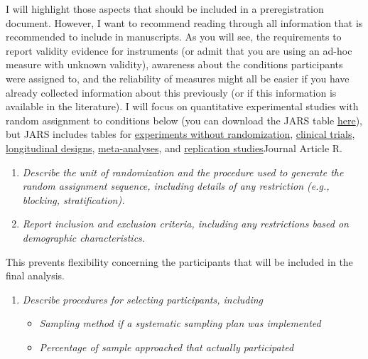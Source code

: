 \documentclass[
  oneside]{book}
\providecommand{\tightlist}{%
  \setlength{\itemsep}{0pt}\setlength{\parskip}{0pt}}
\begin{document}
I will highlight those aspects that should be included in a preregistration document. However, I want to recommend reading through all information that is recommended to include in manuscripts. As you will see, the requirements to report validity evidence for instruments (or admit that you are using an ad-hoc measure with unknown validity), awareness about the conditions participants were assigned to, and the reliability of measures might all be easier if you have already collected information about this previously (or if this information is available in the literature). I will focus on quantitative experimental studies with random assignment to conditions below (you can download the JARS table \href{https://apastyle.apa.org/jars/quant-table-1.pdf}{here}), but JARS includes tables for \href{https://apastyle.apa.org/jars/quant-table-2b.pdf}{experiments without randomization}, \href{https://apastyle.apa.org/jars/quant-table-2c.pdf}{clinical trials}, \href{https://apastyle.apa.org/jars/quant-table-4.pdf}{longitudinal designs}, \href{https://apastyle.apa.org/jars/quant-table-9.pdf}{meta-analyses}, and \href{https://apastyle.apa.org/jars/quant-table-6.pdf}{replication studies}Journal Article R.

\begin{enumerate}
\def\labelenumi{\arabic{enumi}.}
\item
  \emph{Describe the unit of randomization and the procedure used to generate the random assignment sequence, including details of any restriction (e.g., blocking, stratification).}
\item
  \emph{Report inclusion and exclusion criteria, including any restrictions based on demographic characteristics.}
\end{enumerate}

This prevents flexibility concerning the participants that will be included in the final analysis.

\begin{enumerate}
\def\labelenumi{\arabic{enumi}.}
\setcounter{enumi}{2}
\tightlist
\item
  \emph{Describe procedures for selecting participants, including}

  \begin{itemize}
  \tightlist
  \item
    \emph{Sampling method if a systematic sampling plan was implemented}
  \item
    \emph{Percentage of sample approached that actually participated}
  \end{itemize}
\end{enumerate}
\end{document}
